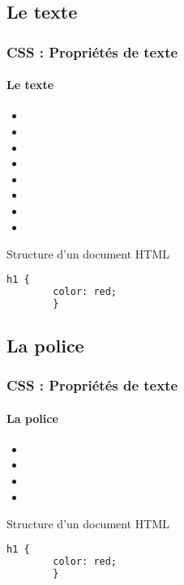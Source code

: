 \documentclass[xcolor=table]{beamer}
\begin{document}
\subsection{Le texte}

\begin{frame}[fragile]
\frametitle{CSS : Propriétés de texte}
\framesubtitle{Le texte}

\begin{minipage}{0.60\textwidth}
	\begin{itemize}
		\item {}
		\item {}
		\item {}
		\item {}
		\item {}
		\item {}
		\item {}
		\item {}
	\end{itemize}
\end{minipage}
%
\begin{minipage}{0.38\textwidth}
	\begin{block}{Structure d'un document HTML}
		\lstset{escapeinside=**}
		\scriptsize\bfseries
		\begin{lstlisting}[language={html}]
		h1 {
		color: red;
		}
		\end{lstlisting}
	\end{block}
\end{minipage}
\end{frame}

\subsection{La police}

\begin{frame}[fragile]
\frametitle{CSS : Propriétés de texte}
\framesubtitle{La police}

\begin{minipage}{0.60\textwidth}
	\begin{itemize}
		\item {}
		\item {}
		\item {}
		\item {}
	\end{itemize}
\end{minipage}
%
\begin{minipage}{0.38\textwidth}
	\begin{block}{Structure d'un document HTML}
		\lstset{escapeinside=**}
		\scriptsize\bfseries
		\begin{lstlisting}[language={html}]
		h1 {
		color: red;
		}
		\end{lstlisting}
	\end{block}
\end{minipage}
\end{frame}
\end{document}
